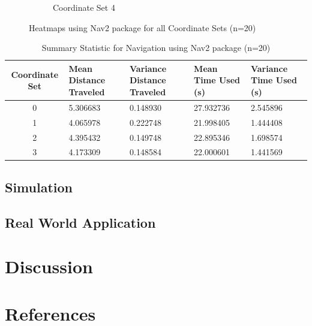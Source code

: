 \documentclass[]{article}
\begin{document}
\begin{figure}[ht]
\begin{subfigure}[b]{0.45\textwidth}
			\caption{Coordinate Set 4}
			\label{fig:fig13}
		\end{subfigure}
		\caption{Heatmaps using Nav2 package for all Coordinate Sets (n=20)}
		\label{fig:heatmaps}
	\end{figure}
	
	
	\begin{table}[h!]
		\centering
		\begin{tabular}{|c|p{3cm}|p{3cm}|p{3cm}|p{3cm}|}
			\hline
			Coordinate Set & Mean Distance \newline Traveled & Variance Distance \newline Traveled & Mean Time \newline Used (s) & Variance Time \newline Used (s) \\
			\hline
			0 & 5.306683 & 0.148930 & 27.932736 & 2.545896 \\
			1 & 4.065978 & 0.222748 & 21.998405 & 1.444408 \\
			2 & 4.395432 & 0.149748 & 22.895346 & 1.698574 \\
			3 & 4.173309 & 0.148584 & 22.000601 & 1.441569 \\
			\hline
		\end{tabular}
		\caption{Summary Statistic for Navigation using Nav2 package (n=20)}
		\label{tab: 1}
	\end{table}
	
	
	\newpage
	
	\subsection{Simulation}
	
	\subsection{Real World Application}
	\section{Discussion}
	\section{References}
	\printbibliography
	
\end{document}
